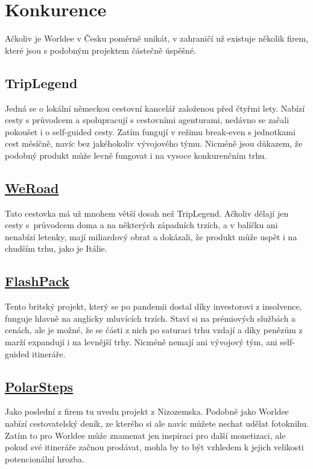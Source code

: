 \section{Konkurence}

Ačkoliv je Worldee v Česku poměrně unikát, v zahraničí už existuje několik firem, které jsou s podobným projektem částečně úspěšné.

\subsection*{TripLegend} 
Jedná se o lokální německou cestovní kancelář založenou před čtyřmi lety. Nabízí cesty s průvodcem a spolupracují s cestovními agenturami, nedávno se začali pokoušet i o self-guided cesty. Zatím fungují v režimu break-even s jednotkami cest měsíčně, navíc bez jakéhokoliv vývojového týmu. Nicméně jsou důkazem, že podobný produkt může levně fungovat i na vysoce konkurenčním trhu.

\subsection*{\href{https://www.weroad.com/}{WeRoad}}
Tato cestovka má už mnohem větší dosah než TripLegend. Ačkoliv dělají jen cesty s~průvodcem doma a na některých západních trzích, a v balíčku ani nenabízí letenky, mají miliardový obrat a dokázali, že produkt může uspět i na chudším trhu, jako je Itálie.

\subsection*{\href{https://www.flashpack.com/}{FlashPack}}
Tento britský projekt, který se po pandemii dostal díky investorovi z insolvence, funguje hlavně na anglicky mluvících trzích. Staví si na prémiových službách a cenách, ale je možné, že se části z nich po saturaci trhu vzdají a díky penězům z marží expandují i na levnější trhy. Nicméně nemají ani vývojový tým, ani self-guided itineráře.

\subsection*{\href{https://www.polarsteps.com/}{PolarSteps}}
Jako poslední z firem tu uvedu projekt z Nizozemska. Podobně jako Worldee nabízí cestovatelský deník, ze kterého si ale navíc můžete nechat udělat fotoknihu. Zatím to pro Worldee může znamenat jen inspiraci pro další monetizaci, ale pokud své itineráře začnou prodávat, mohla by to být vzhledem k jejich velikosti potencionální hrozba.